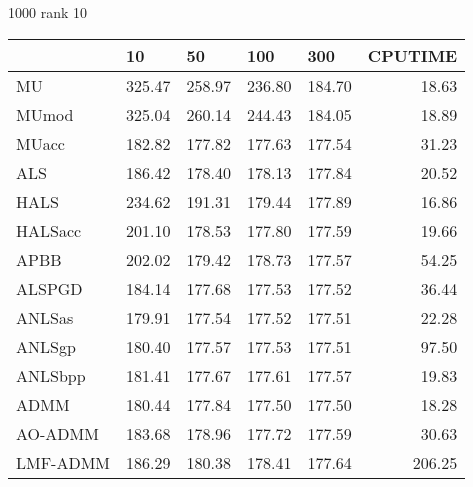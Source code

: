 \documentclass{article}
\begin{document}
1000 rank 10 
\begin{table}[H]
	\centering
	\begin{tabular}{|l|r|r|r|r|r|}
		\hline
		& \multicolumn{1}{l|}{10} & \multicolumn{1}{l|}{50} & \multicolumn{1}{l|}{100} & \multicolumn{1}{l|}{300} & \multicolumn{1}{l|}{CPUTIME} \\ \hline
		MU       & 325.47                  & 258.97                  & 236.80                   & 184.70                   & 18.63                        \\ \hline
		MUmod    & 325.04                  & 260.14                  & 244.43                   & 184.05                   & 18.89                        \\ \hline
		MUacc    & 182.82                  & 177.82                  & 177.63                   & 177.54                   & 31.23                        \\ \hline
		ALS      & 186.42                  & 178.40                  & 178.13                   & 177.84                   & 20.52                        \\ \hline
		HALS     & 234.62                  & 191.31                  & 179.44                   & 177.89                   & 16.86                        \\ \hline
		HALSacc  & 201.10                  & 178.53                  & 177.80                   & 177.59                   & 19.66                        \\ \hline
		APBB     & 202.02                  & 179.42                  & 178.73                   & 177.57                   & 54.25                        \\ \hline
		ALSPGD   & 184.14                  & 177.68                  & 177.53                   & 177.52                   & 36.44                        \\ \hline
		ANLSas   & 179.91                  & 177.54                  & 177.52                   & 177.51                   & 22.28                        \\ \hline
		ANLSgp   & 180.40                  & 177.57                  & 177.53                   & 177.51                   & 97.50                        \\ \hline
		ANLSbpp  & 181.41                  & 177.67                  & 177.61                   & 177.57                   & 19.83                        \\ \hline
		ADMM     & 180.44                  & 177.84                  & 177.50                   & 177.50                   & 18.28                        \\ \hline
		AO-ADMM  & 183.68                  & 178.96                  & 177.72                   & 177.59                   & 30.63                        \\ \hline
		LMF-ADMM & 186.29                  & 180.38                  & 178.41                   & 177.64                   & 206.25                       \\ \hline
	\end{tabular}
\end{table}
\end{document}
